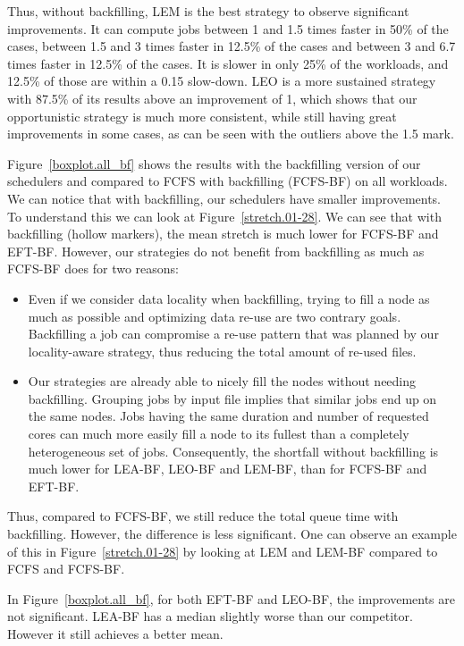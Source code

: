 \documentclass[conference,10pt]{IEEEtran}
\begin{document}
Thus, without backfilling, LEM is the best strategy to observe significant improvements.
It can compute jobs between 1 and 1.5 times faster in 50\% of the cases,
between 1.5 and 3 times faster in 12.5\% of the cases and between 3 and 6.7 times faster in 12.5\% of the cases.
It is slower in only 25\% of the workloads, and 12.5\% of those are within a 0.15 slow-down.
LEO is a more sustained strategy with 87.5\% of its results above an improvement of 1, which shows that our opportunistic
strategy is much more consistent, while still having great improvements in some cases, as can be seen with the outliers above the 1.5 mark.

Figure~\ref{boxplot.all_bf} shows the results with the backfilling version of our
schedulers and compared to FCFS with backfilling (FCFS-BF) on all workloads.
We can notice that with backfilling, our schedulers have smaller improvements.
To understand this we can look at Figure~\ref{stretch.01-28}. We can see that 
with backfilling 
(hollow markers),
the mean stretch is much lower for FCFS-BF and EFT-BF. 
However, our strategies do not benefit from backfilling as much as FCFS-BF does for two reasons:
\begin{itemize}
	\item Even if we consider data locality when backfilling, trying to fill a node as much as possible and optimizing data re-use are two contrary goals. 
	Backfilling a job can compromise a re-use pattern that was planned by our locality-aware strategy, thus reducing the total 
	amount of re-used files.
	\item Our strategies are already able to nicely fill the nodes without needing backfilling.
	Grouping jobs by input file implies that similar jobs end up on the same nodes.
	Jobs having the same duration and number of requested cores can much more easily fill a node to its fullest than a completely heterogeneous set of jobs.
	Consequently, the shortfall without backfilling is much lower for LEA-BF, LEO-BF and LEM-BF, than for FCFS-BF and EFT-BF.
\end{itemize}
Thus, compared to FCFS-BF, we still reduce the total queue time with backfilling.
However, the difference is less significant. One can observe an example of this
in Figure~\ref{stretch.01-28} by looking at LEM and LEM-BF compared to FCFS and FCFS-BF.

In Figure~\ref{boxplot.all_bf}, for both EFT-BF and LEO-BF, the improvements are not significant.
LEA-BF has a median slightly worse than our competitor. However it still
achieves a better mean.
\end{document}

